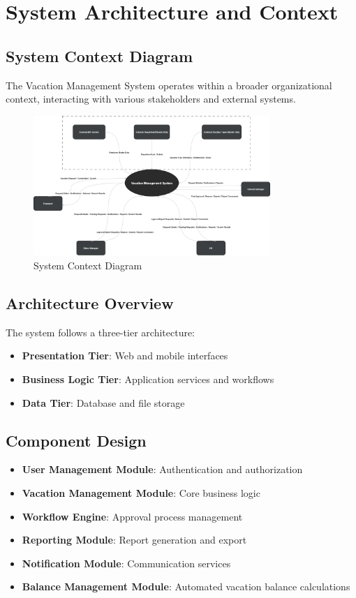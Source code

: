 \documentclass[12pt,a4paper]{article}
\begin{document}
\section{System Architecture and Context}

\subsection{System Context Diagram}
The Vacation Management System operates within a broader organizational context, interacting with various stakeholders and external systems.

\begin{figure}[H]
\centering
\includegraphics[width=0.8\textwidth]{Diagrams/Context/context.drawio.png}
\caption{System Context Diagram}
\label{fig:context}
\end{figure}

\subsection{Architecture Overview}
The system follows a three-tier architecture:
\begin{itemize}
    \item \textbf{Presentation Tier}: Web and mobile interfaces
    \item \textbf{Business Logic Tier}: Application services and workflows
    \item \textbf{Data Tier}: Database and file storage
\end{itemize}

\subsection{Component Design}
\begin{itemize}
    \item \textbf{User Management Module}: Authentication and authorization
    \item \textbf{Vacation Management Module}: Core business logic
    \item \textbf{Workflow Engine}: Approval process management
    \item \textbf{Reporting Module}: Report generation and export
    \item \textbf{Notification Module}: Communication services
    \item \textbf{Balance Management Module}: Automated vacation balance calculations
\end{itemize}
\end{document}

